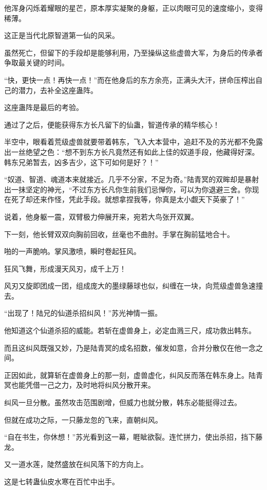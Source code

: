 \begin{this_body}
他浑身闪烁着耀眼的星芒，原本厚实凝聚的身躯，正以肉眼可见的速度缩小，变得稀薄。

这正是当代北原智道第一仙的风采。

虽然死亡，但留下的手段却是能够利用，乃至操纵这些虚兽大军，为身后的传承者争取最关键的时间。

“快，更快一点！再快一点！”而在他身后的东方余亮，正满头大汗，拼命压榨出自己的潜力，去补全这座蛊阵。

这座蛊阵是最后的考验。

通过了之后，便能获得东方长凡留下的仙蛊，智道传承的精华核心！

半空中，眼看着荒级虚兽就要带着韩东，飞入大本营中，追赶不及的苏光都不免露出一丝绝望之色：“想不到东方长凡竟然还有如此上佳的奴道手段，他藏得好深。韩东兄弟暂去，凶多吉少，这下可如何是好？！”

“奴道、智道、魂道本来就接近。几乎不分家，不足为奇。”陆青冥的双眸却是暴射出一抹坚定的神光，“不过东方长凡你生前我们忌惮你，可以为你退避三舍。你现在死了却还来作怪，凭此手段。就想拿捏我等，你真是太小觑天下英豪了！”

说着，他身躯一震，双臂极力伸展开来，宛若大鸟张开双翼。

下一刻，他长臂双双向胸前回收，丝毫也不曲肘。手掌在胸前猛地合十。

啪的一声脆响。掌风激喷，瞬时卷起狂风。

狂风飞舞，形成漫天风刃，成千上万！

风刃又旋即团成一团，组成庞大的墨绿藤球也似，纠缠在一块，向荒级虚兽急速撞去。

“出现了！陆兄的仙道杀招纠风！”苏光神情一振。

他知道这个仙道杀招的威能。若斩在虚兽身上，必定血溅三尺，成功救出韩东。

而且这纠风既强又妙，乃是陆青冥的成名招数，催发如意，合并分散仅在他一念之间。

正因如此，就算斩在虚兽身上的那一刻，虚兽虚化，纠风反而落在韩东身上。陆青冥也能凭借一己之力，及时地将纠风分散开来。

纠风一旦分散。虽然攻击范围剧增，但威力也就分散，韩东必能挺得过去。

但就在成功之际，一只藤龙忽的飞来，直朝纠风。

“自在书生，你休想！”苏光看到这一幕，睚眦欲裂。连忙拼力，使出杀招，挡下藤龙。

又一道水莲，陡然盛放在纠风落下的方向上。

这是七转蛊仙皮水寒在百忙中出手。


\end{this_body}
